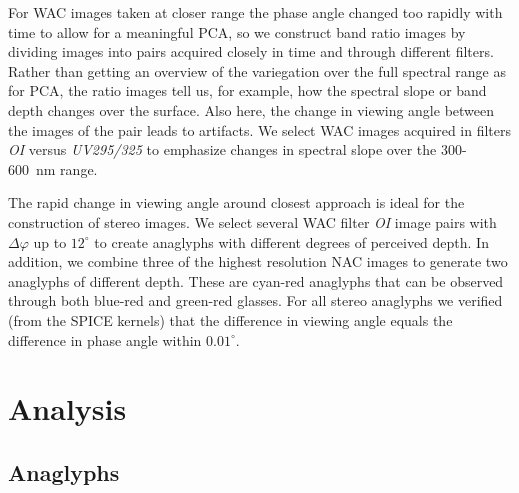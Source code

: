 \documentclass[preprint,3p,authoryear]{elsarticle}
\begin{document}
For WAC images taken at closer range the phase angle changed too rapidly with time to allow for a meaningful PCA, so we construct band ratio images by dividing images into pairs acquired closely in time and through different filters. Rather than getting an overview of the variegation over the full spectral range as for PCA, the ratio images tell us, for example, how the spectral slope or band depth changes over the surface. Also here, the change in viewing angle between the images of the pair leads to artifacts. We select WAC images acquired in filters {\it OI} versus {\it UV295/325} to emphasize changes in spectral slope over the 300-600~nm range.

The rapid change in viewing angle around closest approach is ideal for the construction of stereo images. We select several WAC filter {\it OI} image pairs with $\Delta \varphi$ up to $12^\circ$ to create anaglyphs with different degrees of perceived depth. In addition, we combine three of the highest resolution NAC images to generate two anaglyphs of different depth. These are cyan-red anaglyphs that can be observed through both blue-red and green-red glasses. For all stereo anaglyphs we verified (from the SPICE kernels) that the difference in viewing angle equals the difference in phase angle within $0.01^\circ$.


\section{Analysis}
\label{sec:analysis}

\subsection{Anaglyphs}
\end{document}
